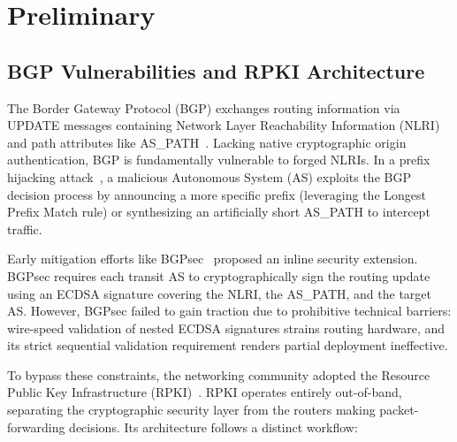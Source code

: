 \documentclass[conference]{IEEEtran}
\newcommand{\rj}[1]{{\color{blue}#1}}
\newcommand{\yiwen}[1]{{\color{ForestGreen}#1}}
\begin{document}



\section{Preliminary}
\subsection{BGP Vulnerabilities and RPKI Architecture}
\yiwen{The Border Gateway Protocol (BGP) exchanges routing information via UPDATE messages containing Network Layer Reachability Information (NLRI) and path attributes like AS\_PATH~\cite{lougheed1990rfc1163}. Lacking native cryptographic origin authentication, BGP is fundamentally vulnerable to forged NLRIs. In a prefix hijacking attack~\cite{prefixHijacking}, a malicious Autonomous System (AS) exploits the BGP decision process by announcing a more specific prefix (leveraging the Longest Prefix Match rule) or synthesizing an artificially short AS\_PATH to intercept traffic.}

\yiwen{Early mitigation efforts like BGPsec~\cite{rfc8205BGPSec} proposed an inline security extension. BGPsec requires each transit AS to cryptographically sign the routing update using an ECDSA signature covering the NLRI, the AS\_PATH, and the target AS. However, BGPsec failed to gain traction due to prohibitive technical barriers: wire-speed validation of nested ECDSA signatures strains routing hardware, and its strict sequential validation requirement renders partial deployment ineffective.}

\yiwen{To bypass these constraints, the networking community adopted the Resource Public Key Infrastructure (RPKI)~\cite{RPKI}. RPKI operates entirely out-of-band, separating the cryptographic security layer from the routers making packet-forwarding decisions. Its architecture follows a distinct workflow:}
\end{document}
